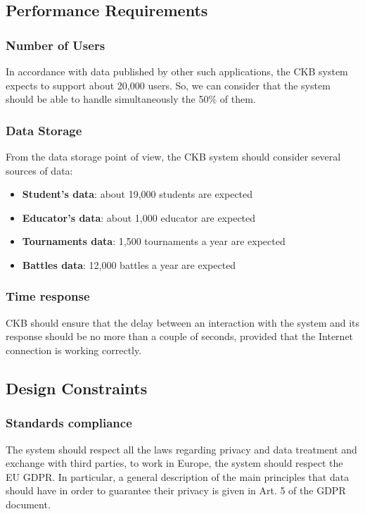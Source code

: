 \clearpage

\subsection{Performance Requirements}
\subsubsection{Number of Users}
In accordance with data published by other such applications, the CKB system expects to support about 20,000 users. So, we can consider that the system should be able to handle simultaneously the 50\% of them.

\subsubsection{Data Storage}
From the data storage point of view, the CKB system should consider several sources of data:
\begin{itemize}
    \item \textbf{Student's data}: about 19,000 students are expected
    \item \textbf{Educator's data}: about 1,000 educator are expected
    \item \textbf{Tournaments data}: 1,500 tournaments a year are expected
    \item \textbf{Battles data}: 12,000 battles a year are expected
\end{itemize}

\subsubsection{Time response}
CKB should ensure that the delay between an interaction with the system and its response should be no more than a couple of seconds, provided that the Internet connection is working correctly.


\subsection{Design Constraints}
\subsubsection{Standards compliance}
The system should respect all the laws regarding privacy and data treatment and exchange with third parties, to work in Europe, the system should respect the EU GDPR. In particular, a general description of the main principles that data should have in order to guarantee their privacy is given in Art. 5 of the GDPR document.

